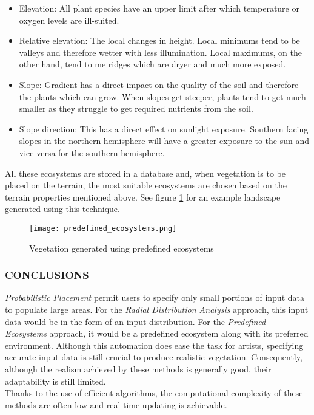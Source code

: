 \begin{itemize}
\item Elevation: All plant species have an upper limit after which temperature or oxygen levels are ill-suited.
\item Relative elevation: The local changes in height. Local minimums tend to be valleys and therefore wetter with less illumination. Local maximums, on the other hand, tend to me ridges which are dryer and much more exposed.
\item Slope: Gradient has a direct impact on the quality of the soil and therefore the plants which can grow. When slopes get steeper, plants tend to get much smaller as they struggle to get required nutrients from the soil.
\item Slope direction: This has a direct effect on sunlight exposure. Southern facing slopes in the northern hemisphere will have a greater exposure to the sun and vice-versa for the southern hemisphere.  
\end{itemize}

All these ecosystems are stored in a database and, when vegetation is to be placed on the terrain, the most suitable ecosystems are chosen based on the terrain properties mentioned above. See figure \ref{Vegetation generated using predefined ecosystems} for an example landscape generated using this technique.

\begin{figure}[h]
  \centering
	\label{Vegetation generated using predefined ecosystems}
	\texttt{[image: predefined\_ecosystems.png]}
	\caption{Vegetation generated using predefined ecosystems \cite{Hammes2001}}
\end{figure}

\subsubsection{CONCLUSIONS}

\textit{Probabilistic Placement} permit users to specify only small portions of input data to populate large areas. For the \textit{Radial Distribution Analysis} approach, this input data would be in the form of an input distribution. For the \textit{Predefined Ecosystems} approach, it would be a predefined ecosystem along with its preferred environment. Although this automation does ease the task for artists, specifying accurate input data is still crucial to produce realistic vegetation. Consequently, although the realism achieved by these methods is generally good, their adaptability is still limited. \\
Thanks to the use of efficient algorithms, the computational complexity of these methods are often low and real-time updating is achievable. 

